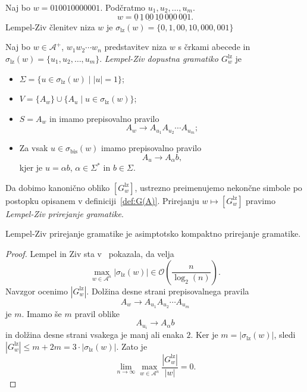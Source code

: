 \documentclass[fin1, tisk]{fmfdelo}
\providecommand{\abs}[1]{\left\lvert #1 \right\rvert}
\newcommand{\A}{\mathcal{A}}
\theoremstyle{definition}
\begin{document}
\begin{primer}\label{primer:LZČlenitev}
    Naj bo $w = 010010000001$. Podčratmo $u_1, u_2, \ldots, u_m$.
    \[
    w = \underline{0} \, \underline{1} \, \underline{00} \, \underline{10} \, \underline{000}
    \, \underline{001}.
    \]
    Lempel-Ziv členitev niza $w$ je $\sigma_{\text{lz}}(w) = \{ 0, 1, 00, 10, 000, 001 \}$
\end{primer}

\begin{definicija}
    Naj bo $w \in \A^+$, $w_1w_2 \cdots w_n$ predstavitev niza $w$ s črkami abecede in 
    $\sigma_\text{lz}(w) = \{ u_1, u_2, \ldots, u_m \}$.
    \emph{Lempel-Ziv dopustna gramatiko $G^\text{lz}_w$} je
    \begin{itemize}
        \item $\Sigma = \{ u \in \sigma_{\text{lz}}(w) \mid \abs{u} = 1 \}$;
        \item $V = \{ A_w \} \cup \{ A_u \mid u \in \sigma_{\text{lz}}(w) \}$;
        \item $S = A_w$ in imamo prepisovalno pravilo 
        \[ 
            A_w \rightarrow A_{u_1}A_{u_2} \cdots A_{u_m};
        \]
        \item Za vsak $u \in \sigma_{\text{bis}}(w)$ imamo prepisovalno pravilo
        \[
            A_u \rightarrow A_{\alpha}b,
        \]
        kjer je $u = \alpha b$, $\alpha \in \Sigma^*$ in $b \in \Sigma$.
    \end{itemize}
    Da dobimo kanonično obliko $[G^\text{lz}_w]$, ustrezno preimenujemo nekončne simbole po
    postopku opisanem v definiciji~\ref{def:G(A)}. Prirejanju $w \mapsto [G^\text{lz}_w]$ pravimo
     \emph{Lempel-Ziv prirejanje gramatike}.
\end{definicija}

\begin{trditev}
    Lempel-Ziv prirejanje gramatike je asimptotsko kompaktno prirejanje gramatike.
\end{trditev}

\begin{proof}
    Lempel in Ziv sta v~\cite{LempelZiv1976} pokazala, da velja
    \[
        \max_{w \in \A^n} \abs{\sigma_\text{lz}(w)} \in \mathcal{O} \left( \frac{n}{\log_2(n)} \right).
    \]
    Navzgor ocenimo $\abs{G^\text{lz}_w}$. Dolžina desne strani prepisovalnega pravila
    \[ 
        A_w \rightarrow A_{u_1}A_{u_2} \cdots A_{u_m}
    \]
    je $m$. Imamo še $m$ pravil oblike
    \[
        A_{u_i} \rightarrow A_{\alpha}b
    \]
    in dolžina desne strani vsakega je manj ali enaka $2$. Ker je $m = \abs{\sigma_\text{lz}(w)}$,
    sledi $\abs{G^\text{lz}_w} \leq m + 2m = 3 \cdot \abs{\sigma_\text{lz}(w)}$. Zato je
    \[
        \lim_{n \rightarrow \infty} \max_{w \in \A^n} \frac{\abs{G^\text{lz}_w}}{\abs{w}} = 0.
    \]
\end{proof}
\end{document}
